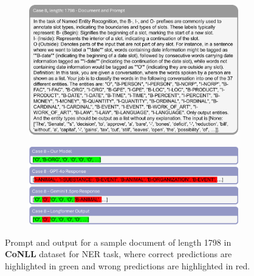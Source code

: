 \documentclass[11pt]{article}
\begin{document}
\begin{figure}[!h]
    \centering
    \begin{subfigure}[b]{1.0\linewidth}   
        \includegraphics[width=\textwidth]{images/case8_prompt.png} 
    \end{subfigure}
    \vspace{1pt}
    \begin{subfigure}[b]{1.0\linewidth}  
        \includegraphics[width=\textwidth]{images/case8_ans.png}
    \end{subfigure}
    \caption{Prompt and output for a sample document of length 1798 in \textbf{CoNLL} dataset for NER task, where correct predictions are highlighted in green and wrong predictions are highlighted in red.}
    \label{case8}
\end{figure}
\end{document}
